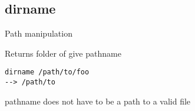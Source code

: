 \subsection{dirname}

\begin{frame}[fragile]{Path manipulation}
  \begin{exampleblock}{Returns folder of give pathname}
    \begin{lstlisting}[showstringspaces=false]
dirname /path/to/foo
--> /path/to
    \end{lstlisting}
  \end{exampleblock}
  \pause
pathname does not have to be a path to a valid file
\end{frame}

